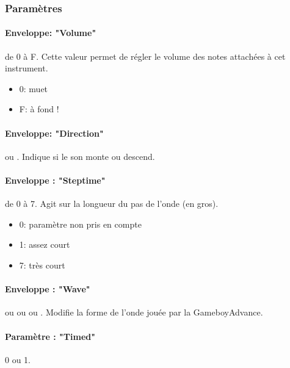 
\subsubsection{Paramètres}

\paragraph{Enveloppe: "Volume"} de 0 à F.
Cette valeur permet de régler le volume des notes attachées à cet instrument.
\medskip

\begin{itemize}
    \item{0: muet}
    \item{F: à fond !}
\end{itemize}

\paragraph{Enveloppe: "Direction"}  ou .
Indique si le son monte ou descend.

\paragraph{Enveloppe : "Steptime"} de 0 à 7.
Agit sur la longueur du pas de l'onde (en gros).
\medskip

\begin{itemize}
    \item{0: paramètre non pris en compte}
    \item{1: assez court}
    \item{7: très court}
\end{itemize}

\paragraph{Enveloppe : "Wave"}  ou  ou  ou .
Modifie la forme de l'onde jouée par la GameboyAdvance.

\paragraph{Paramètre : "Timed"} 0 ou 1.
\medskip

